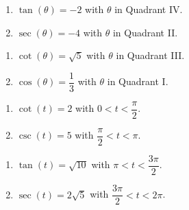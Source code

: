 \documentclass{ximera}
\begin{document}
\begin{multicols}{2}

\begin{enumerate}

\setcounter{enumi}{\value{HW}}

\item  $\tan(\theta) = -2$ with $\theta$ in Quadrant IV.
\item  $\sec(\theta) = -4$ with $\theta$ in Quadrant II.

\setcounter{HW}{\value{enumi}}

\end{enumerate}

\end{multicols}

\begin{multicols}{2}

\begin{enumerate}

\setcounter{enumi}{\value{HW}}

\item $\cot(\theta) = \sqrt{5}$ with $\theta$ in Quadrant III. 
\item  $\cos(\theta) = \dfrac{1}{3}$ with $\theta$ in Quadrant I.

\setcounter{HW}{\value{enumi}}

\end{enumerate}

\end{multicols}

\begin{multicols}{2}

\begin{enumerate}

\setcounter{enumi}{\value{HW}}

\item  $\cot(t) = 2$ with $0  < t < \dfrac{\pi}{2}$.
\item  $\csc(t) = 5$ with $\dfrac{\pi}{2} < t < \pi$.

\setcounter{HW}{\value{enumi}}

\end{enumerate}

\end{multicols}

\begin{multicols}{2}

\begin{enumerate}

\setcounter{enumi}{\value{HW}}

\item  $\tan(t) = \sqrt{10}$ with $\pi < t < \dfrac{3\pi}{2}$.
\item  $\sec(t) = 2\sqrt{5}$ with $\dfrac{3\pi}{2} < t < 2\pi$.\label{useidsforvalueslast02}


\setcounter{HW}{\value{enumi}}

\end{enumerate}

\end{multicols}
\end{document}
